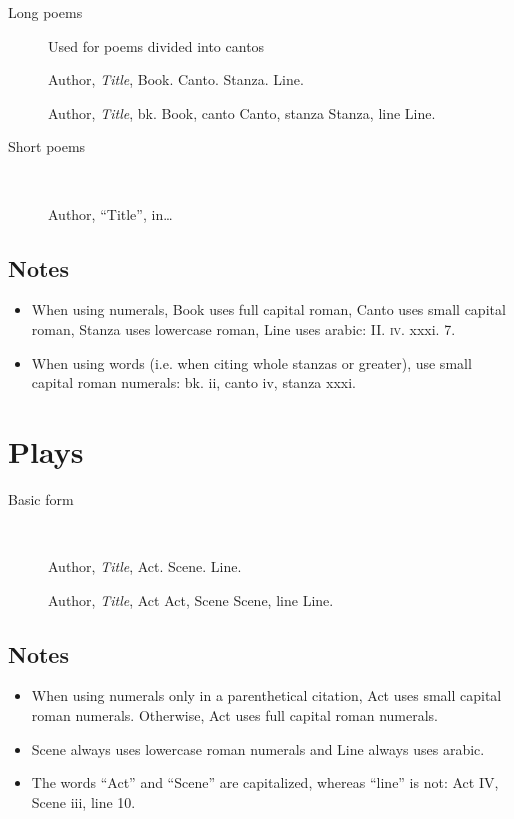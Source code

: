 \documentclass[extrafontsizes,11pt,a4paper,oneside]{memoir}
\newcommand*{\lit}[1]{\textsf{#1}}
\begin{document}
    \begin{description}
        \item[Long poems] Used for poems divided into cantos
        \par Author, \emph{Title}, Book. Canto. Stanza. Line.
        \par Author, \emph{Title}, \lit{bk.} Book, \lit{canto} Canto, \lit{stanza} Stanza, \lit{line} Line.
        
        \item[Short poems]~\par
        \par Author, \enquote{Title}, in\dots
    \end{description}
    
    \subsection{Notes}
    \begin{itemize}
        \item When using numerals, Book uses full capital roman, Canto uses small capital roman, Stanza uses lowercase roman, Line uses arabic: II. \textsc{iv}. xxxi. 7.
        
        \item When using words (i.e. when citing whole stanzas or greater), use small capital roman numerals: bk. ii, canto iv, stanza xxxi.
    \end{itemize}
    
    \section{Plays}\label{sec:play}
    
    \begin{description}
        \item[Basic form]~
        \par Author, \emph{Title}, Act. Scene. Line.
        \par Author, \emph{Title}, \lit{Act} Act, \lit{Scene} Scene, \lit{line} Line.
    \end{description}
    
    \subsection{Notes}
    \begin{itemize}
        \item When using numerals only in a parenthetical citation, Act uses small capital roman numerals. Otherwise, Act uses full capital roman numerals.
        
        \item Scene always uses lowercase roman numerals and Line always uses arabic.
        
        \item The words \enquote{Act} and \enquote{Scene} are capitalized, whereas \enquote{line} is not: Act IV, Scene iii, line 10.
    \end{itemize}
    
\end{document}
